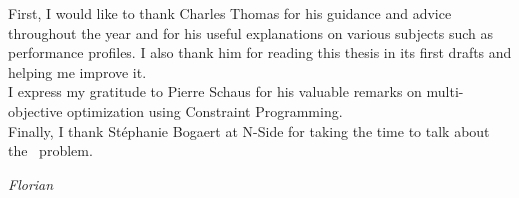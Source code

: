 \documentclass[../thesis.tex]{subfiles}
\begin{document}
First, I would like to thank Charles Thomas for his guidance and advice throughout the year and for his useful explanations on various subjects such as performance profiles.
I also thank him for reading this thesis in its first drafts and helping me improve it. \\ 

I express my gratitude to Pierre Schaus for his valuable remarks on multi-objective optimization using Constraint Programming. \\ 

Finally, I thank Stéphanie Bogaert at N-Side for taking the time to talk about
the \vone\ problem.

\begin{flushright}
  \textit{Florian}
\end{flushright}
\end{document}
